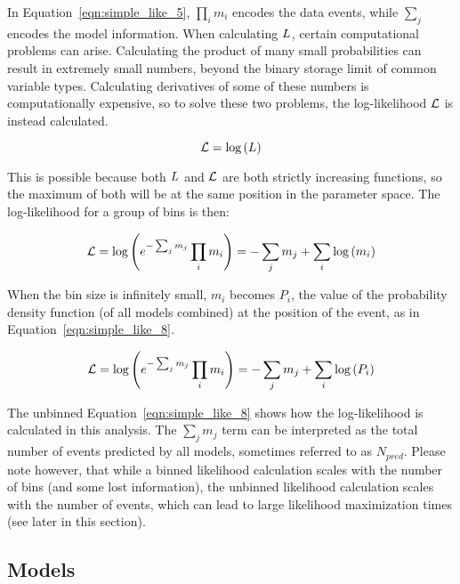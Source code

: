   In Equation~\ref{eqn:simple_like_5}, $\prod_i m_i$ encodes the data events, while $\sum_j$ encodes the model information.
  When calculating $L$, certain computational problems can arise.
  Calculating the product of many small probabilities can result in extremely small numbers, beyond the binary storage limit of common variable types.
  Calculating derivatives of some of these numbers is computationally expensive, so to solve these two problems, the log-likelihood $\mathcal{L}$ is instead calculated.
  
  \begin{equation}\label{eqn:simple_like_6}
    \mathcal{L} = \textrm{log} \left ( L \right ) 
  \end{equation}
  
  This is possible because both $L$ and $\mathcal{L}$ are both strictly increasing functions, so the maximum of both will be at the same position in the parameter space.
  The log-likelihood for a group of bins is then:
  
  \begin{equation}\label{eqn:simple_like_7}
    \mathcal{L} = \textrm{log} \left ( e^{- \sum_j m_j} \prod_i m_i \right ) = - \sum_j m_j + \sum_i \textrm{log} \left ( m_i \right )
  \end{equation}
  
  When the bin size is infinitely small, $m_i$ becomes $P_i$, the value of the probability density function (of all models combined) at the position of the event, as in Equation~\ref{eqn:simple_like_8}.
  
  \begin{equation}\label{eqn:simple_like_8}
    \mathcal{L} = \textrm{log} \left ( e^{- \sum_j m_j} \prod_i m_i \right ) = - \sum_j m_j + \sum_i \textrm{log} \left ( P_i \right )
  \end{equation}
  
  The unbinned Equation~\ref{eqn:simple_like_8} shows how the log-likelihood is calculated in this analysis.
  The $\sum_{j} m_{j}$ term can be interpreted as the total number of events predicted by all models, sometimes referred to as $N_{pred}$.
  Please note however, that while a binned likelihood calculation scales with the number of bins (and some lost information), the unbinned likelihood calculation scales with the number of events, which can lead to large likelihood maximization times (see later in this section).
  
  \subsection{Models}\label{sec:model_irf_folding}
  
